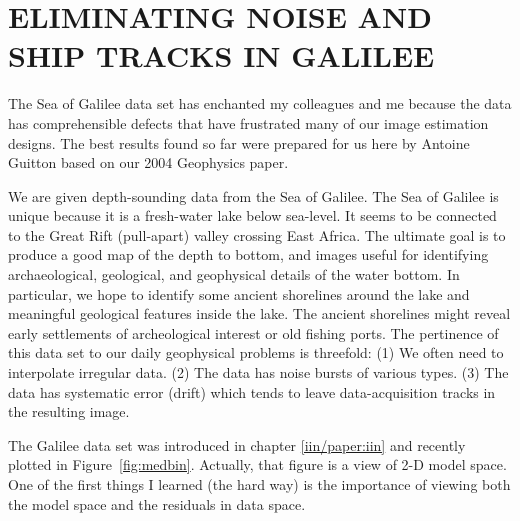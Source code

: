 \section{ELIMINATING NOISE AND SHIP TRACKS IN GALILEE}

\par
The Sea of Galilee data set has enchanted my colleagues and me
because the data has comprehensible defects
that have frustrated many of our image estimation designs.
The best results found so far were prepared for us here
by Antoine Guitton based on our 2004 Geophysics paper.

\par

We are given depth-sounding data from the Sea of 
Galilee.  The Sea of Galilee is unique
because it is a fresh-water lake below sea-level.
It seems to be connected to the Great Rift (pull-apart)
valley crossing East Africa. The ultimate goal is to produce a good map of
the depth to bottom, and images useful for identifying archaeological,
geological, and geophysical details of the water bottom. In particular,
we hope to identify some ancient shorelines around the lake and meaningful 
geological features inside the lake. The ancient shorelines might
reveal early settlements of archeological interest or old fishing ports.
The pertinence of this data set to our daily geophysical problems is threefold:
(1) We often need to interpolate irregular data.
(2) The data has noise bursts of various types.
(3) The data has systematic error (drift)
which tends to leave data-acquisition tracks in the resulting image.

\par
The Galilee data set was introduced in chapter \ref{iin/paper:iin}
and recently plotted in Figure~\ref{fig:medbin}.
Actually, that figure is a view of 2-D model space.
One of the first things I learned (the hard way) is the importance
of viewing both the model space and the residuals in data space.
\par
{}

